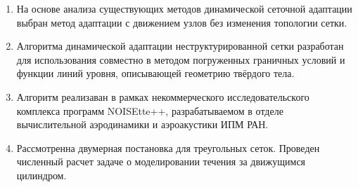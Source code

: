 \begin{enumerate}
	\item На основе анализа существующих методов динамической сеточной адаптации выбран метод адаптации с движением узлов без изменения топологии сетки.
	\item  Алгоритма динамической адаптации неструктурированной сетки разработан для  использования совместно в методом погруженных граничных условий и функции линий уровня, описывающей геометрию твёрдого тела.
	\item Алгоритм реализаван в рамках некоммерческого исследовательского комплекса программ NOISEtte++, разрабатываемом в отделе вычислительной аэродинамики и аэроакустики ИПМ РАН.
	\item Рассмотренна двумерная постановка для треугольных сеток. Проведен численный расчет задаче о моделировании течения за движущимся цилиндром.
\end{enumerate}

